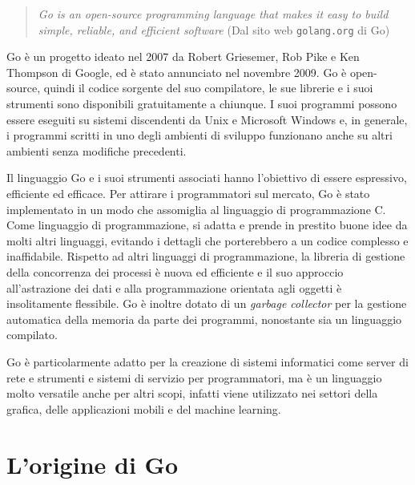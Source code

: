 %
\begin{quotation}
    \begin{small}
        \textit{Go is an open-source programming language that makes it easy to build simple, reliable, and efficient software} (Dal sito web \verb|golang.org| di Go)
    \end{small}
\end{quotation}
Go è un progetto ideato nel 2007 da Robert Griesemer, Rob Pike e Ken Thompson di Google, ed è stato annunciato nel novembre 2009.
Go è open-source, quindi il codice sorgente del suo compilatore, le sue librerie e i suoi strumenti sono disponibili gratuitamente a chiunque.
I suoi programmi possono essere eseguiti su sistemi discendenti da Unix e Microsoft Windows e, in generale, i programmi scritti in uno degli ambienti di sviluppo funzionano anche su altri ambienti senza modifiche precedenti.

Il linguaggio Go e i suoi strumenti associati hanno l'obiettivo di essere espressivo, efficiente ed efficace.
Per attirare i programmatori sul mercato, Go è stato implementato in un modo che assomiglia al linguaggio di programmazione C\@.
Come linguaggio di programmazione, si adatta e prende in prestito buone idee da molti altri linguaggi, evitando i dettagli che porterebbero a un codice complesso e inaffidabile.
Rispetto ad altri linguaggi di programmazione, la libreria di gestione della concorrenza dei processi è nuova ed efficiente e il suo approccio all'astrazione dei dati e alla programmazione orientata agli oggetti è insolitamente flessibile.
Go è inoltre dotato di un \textit{garbage collector} per la gestione automatica della memoria da parte dei programmi, nonostante sia un linguaggio compilato.

Go è particolarmente adatto per la creazione di sistemi informatici come server di rete e strumenti e sistemi di servizio per programmatori, ma è un linguaggio molto versatile anche per altri scopi, infatti viene utilizzato nei settori della grafica, delle applicazioni mobili e del machine learning.


\section*{L'origine di Go}


